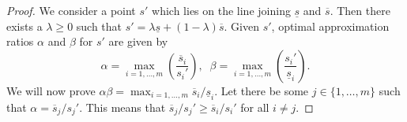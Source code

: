 \documentclass{article}
\begin{document}
\begin{proof}%
	We consider a point \(s'\) which lies on the line joining \(\underline{s}\) and \(\overline{s}\). 
	Then there exists a \(\lambda \geq 0\) such that 
	$s' = \lambda \underline{s} + (1 - \lambda)\overline{s}$.
	Given \(s'\), optimal approximation ratios
	\(\alpha\) and \(\beta\) for  \(s'\) are given by 
	\[
	\alpha = \max_{i=1,\dots,m}\left(\frac{\overline{s}_i}{s_i'}\right),\;\;\beta = \max_{i=1,\dots,m} \left(\frac{s_i'}{\underline{s}_i}\right).
	\]
	We will now prove \(\alpha \beta = \max_{i=1,\dots,m}{\overline{s}_i}/{\underline{s}_i}\).
	Let there be some \(j \in \{1, \ldots, m\}\) such that \(\alpha = {\overline{s}_{j}}/{s_{j}'}\). This means that \({\overline{s}_{j}}/{s_{j}'} \geq {\overline{s}_{i}}/{s_{i}'}\) for all \(i\neq j\). 

\end{proof}
\end{document}
